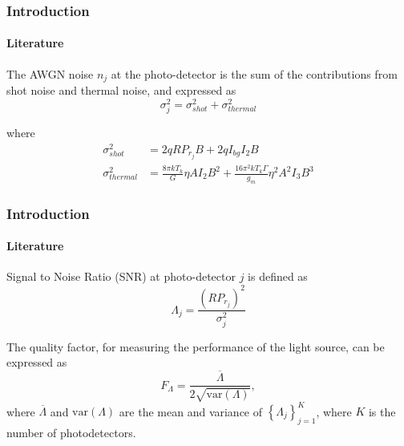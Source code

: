 \documentclass[slidestop,usepdftitle=false]{gvvslides}
\providecommand{\brak}[1]{\ensuremath{\left(#1\right)}}
\providecommand{\cbrak}[1]{\ensuremath{\left\{#1\right\}}}
\begin{document}
\begin{frame}
\frametitle{Introduction}
\framesubtitle{Literature}
\begin{list}{} {}
\vfill
\item<1->The AWGN noise $n_j$ at the photo-detector is 
the sum of the contributions from shot noise and thermal noise, and expressed as %
%
\begin{equation}
\label{variance}
\sigma_j^2 = \sigma_{shot}^2+\sigma_{thermal}^2\nonumber
\end{equation}
\vfill
\item<2>where
\begin{equation}
\begin{split}
\sigma_{shot}^2 &= 2qRP_{r_j}B + 2q I_{bg} I_2 B \\
\sigma_{thermal}^2 &=\frac{8\pi kT_k}{G}\eta AI_2B^2 + \frac{16\pi^2kT_k\Gamma}{g_m}\eta^2 A^2I_3B^3
\end{split}\nonumber
\end{equation}
\vfill
\end{list}
\end{frame}
%
\begin{frame}
\frametitle{Introduction}
\framesubtitle{Literature}

\begin{list}{} {}
\vfill
\item<1-> Signal to Noise Ratio (SNR) at photo-detector $j$ is defined as
\begin{equation}
\label{eq:snr}
\Lambda_j = \frac{\brak{RP_{r_j}}^2}{\sigma_j^2}  \nonumber
\end{equation}
\vfill
\item<2-> The quality factor, for measuring the performance  of the light source, can be expressed as
\begin{equation}
\label{quality}
F_{\Lambda}=\frac{\overline{\Lambda}}{2\sqrt{\text{var}(\Lambda)}}, \nonumber
\end{equation}
where 
  $\overline{\Lambda}$  and $\text{var}(\Lambda)$  are the mean and variance of $\cbrak{\Lambda_j}_{j=1}^{K}$, where $K$ is the number of photodetectors. 
\vfill
\end{list}
\end{frame}
\end{document}
